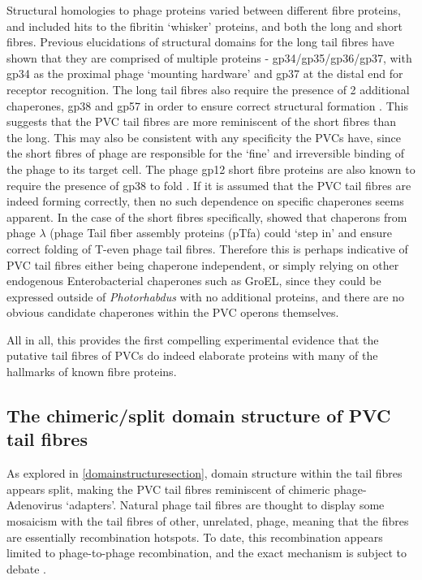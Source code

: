 Structural homologies to phage proteins varied between different fibre proteins, and included hits to the fibritin `whisker' proteins, and both the long and short fibres. Previous elucidations of structural domains for the long tail fibres have shown that they are comprised of multiple proteins - gp34/gp35/gp36/gp37, with gp34 as the proximal phage `mounting hardware' and gp37 at the distal end for receptor recognition. The long tail fibres also require the presence of 2 additional chaperones, gp38 and gp57 in order to ensure correct structural formation \citep{Granell2014a, Bartual2010}. This suggests that the PVC tail fibres are more reminiscent of the short fibres than the long. This may also be consistent with any specificity the PVCs have, since the short fibres of phage are responsible for the `fine' and irreversible binding of the phage to its target cell. The phage gp12 short fibre proteins are also known to require the presence of gp38 to fold \citep{Hashemolhosseini1996}. If it is assumed that the PVC tail fibres are indeed forming correctly, then no such dependence on specific chaperones seems apparent. In the case of the short fibres specifically, \cite{Hashemolhosseini1996} showed that chaperons from phage $\lambda$ (phage Tail fiber assembly proteins (pTfa) could `step in' and ensure correct folding of T-even phage tail fibres. Therefore this is perhaps indicative of PVC tail fibres either being chaperone independent, or simply relying on other endogenous Enterobacterial chaperones such as GroEL, since they could be expressed outside of \emph{Photorhabdus} with no additional proteins, and there are no obvious candidate chaperones within the PVC operons themselves. 

All in all, this provides the first compelling experimental evidence that the putative tail fibres of PVCs do indeed elaborate proteins with many of the hallmarks of known fibre proteins.

\subsection{The chimeric/split domain structure of PVC tail fibres}
As explored in \vref{domainstructuresection}, domain structure within the tail fibres appears split, making the PVC tail fibres reminiscent of chimeric phage-Adenovirus `adapters'. Natural phage tail fibres are thought to display some mosaicism with the tail fibres of other, unrelated, phage, meaning that the fibres are essentially recombination hotspots. To date, this recombination appears limited to phage-to-phage recombination, and the exact mechanism is subject to debate \citep{Sandmeler1994}. 

